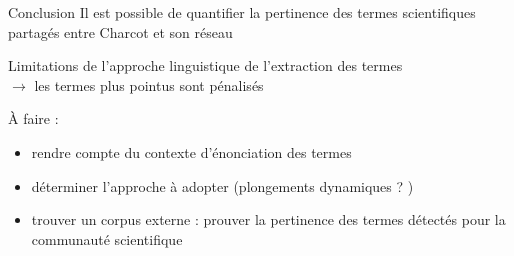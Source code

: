 \begin{frame}{Conclusion}
	Il est possible de quantifier la pertinence des termes scientifiques partagés entre Charcot et son réseau
	\bigskip
	
	\danger Limitations de l'approche linguistique de l'extraction des termes\\$\rightarrow$ les termes plus pointus sont pénalisés
			
\bigskip
	À faire :
	\begin{itemize}
		\item rendre compte du contexte d'énonciation des termes
		\item déterminer l'approche à adopter (plongements dynamiques ? )
		\item trouver un corpus \og{}externe\fg{} : prouver la pertinence des termes détectés pour la communauté scientifique
	\end{itemize}
\end{frame}

